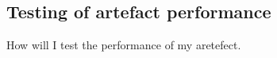 \documentclass[lettersize,journal]{IEEEtran}
\begin{document}
	\subsection{Testing of artefact performance}
	How will I test the performance of my aretefect.







%
%
%
\end{document}
